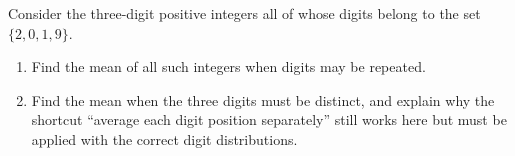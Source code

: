Consider the three-digit positive integers all of whose digits belong to the set \(\{2,0,1,9\}\).
\begin{enumerate}
\item[(a)] Find the mean of all such integers when digits may be repeated.
\item[(b)] Find the mean when the three digits must be distinct, and explain why the shortcut ``average each digit position separately'' still works here but must be applied with the correct digit distributions.
\end{enumerate}
